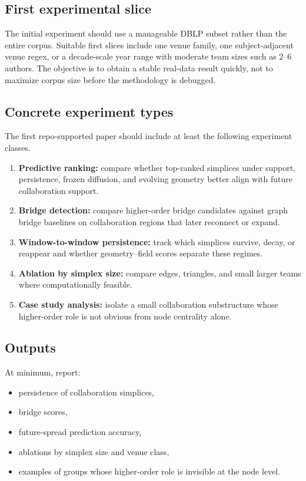 \documentclass[11pt]{article}
\begin{document}
\subsection*{First experimental slice}
The initial experiment should use a manageable DBLP subset rather than the entire corpus. Suitable first slices include one venue family, one subject-adjacent venue regex, or a decade-scale year range with moderate team sizes such as 2--6 authors. The objective is to obtain a stable real-data result quickly, not to maximize corpus size before the methodology is debugged.

\subsection*{Concrete experiment types}
The first repo-supported paper should include at least the following experiment classes.
\begin{enumerate}[label=(E\arabic*)]
    \item \textbf{Predictive ranking:} compare whether top-ranked simplices under support, persistence, frozen diffusion, and evolving geometry better align with future collaboration support.
    \item \textbf{Bridge detection:} compare higher-order bridge candidates against graph bridge baselines on collaboration regions that later reconnect or expand.
    \item \textbf{Window-to-window persistence:} track which simplices survive, decay, or reappear and whether geometry--field scores separate these regimes.
    \item \textbf{Ablation by simplex size:} compare edges, triangles, and small larger teams where computationally feasible.
    \item \textbf{Case study analysis:} isolate a small collaboration substructure whose higher-order role is not obvious from node centrality alone.
\end{enumerate}

\subsection*{Outputs}
At minimum, report:
\begin{itemize}
    \item persistence of collaboration simplices,
    \item bridge scores,
    \item future-spread prediction accuracy,
    \item ablations by simplex size and venue class,
    \item examples of groups whose higher-order role is invisible at the node level.
\end{itemize}
\end{document}
